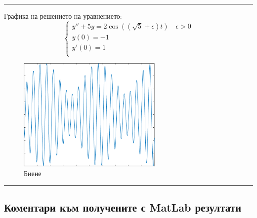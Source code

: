 \documentclass[11pt]{article}
\newcommand{\picturewidth}{7cm}
\begin{document}
\noindent
\hrule height 0.1pt
\vskip 0.2cm

Графика на решението на уравнението:
$$
\begin{cases}
    y'' + 5y = 2 \cos((\sqrt{5} + \epsilon) t) \quad \epsilon > 0 \\
    y(0) = -1 \\
    y'(0) = 1 \\
\end{cases}
$$

\begin{figure}[H]
    \centering
    \includegraphics[width=\picturewidth]{pictures/biene.png}
    \caption{Биене}
    \label{fig:beats}
\end{figure}

\noindent
\hrule height 0.1pt
\vskip 0.2cm

\newpage

\subsection{Коментари към получените с MatLab резултати}
\end{document}
